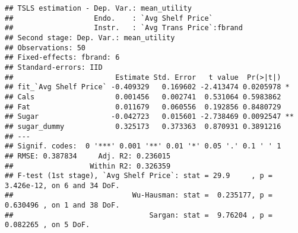 \documentclass[
]{article}
\begin{document}
\begin{verbatim}
## TSLS estimation - Dep. Var.: mean_utility
##                   Endo.    : `Avg Shelf Price`
##                   Instr.   : `Avg Trans Price`:fbrand
## Second stage: Dep. Var.: mean_utility
## Observations: 50
## Fixed-effects: fbrand: 6
## Standard-errors: IID 
##                        Estimate Std. Error   t value  Pr(>|t|)    
## fit_`Avg Shelf Price` -0.409329   0.169602 -2.413474 0.0205978 *  
## Cals                   0.001456   0.002741  0.531064 0.5983862    
## Fat                    0.011679   0.060556  0.192856 0.8480729    
## Sugar                 -0.042723   0.015601 -2.738469 0.0092547 ** 
## sugar_dummy            0.325173   0.373363  0.870931 0.3891216    
## ---
## Signif. codes:  0 '***' 0.001 '**' 0.01 '*' 0.05 '.' 0.1 ' ' 1
## RMSE: 0.387834     Adj. R2: 0.236015
##                  Within R2: 0.326359
## F-test (1st stage), `Avg Shelf Price`: stat = 29.9     , p = 3.426e-12, on 6 and 34 DoF.
##                            Wu-Hausman: stat =  0.235177, p = 0.630496 , on 1 and 38 DoF.
##                                Sargan: stat =  9.76204 , p = 0.082265 , on 5 DoF.
\end{verbatim}
\end{document}
